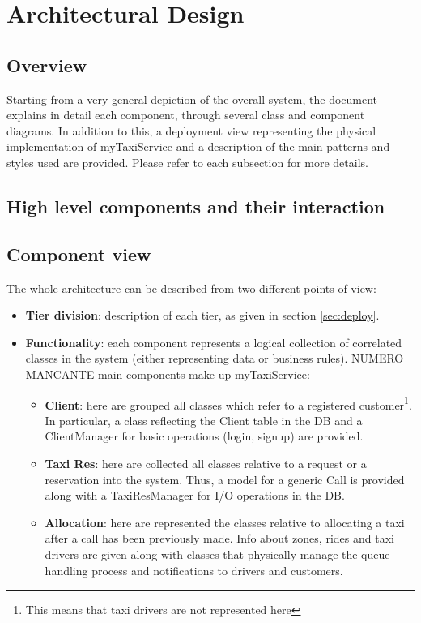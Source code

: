 \pagebreak
\section{Architectural Design}
 
\subsection{Overview}
Starting from a very general depiction of the overall system, the document explains in detail each component, through several class and component diagrams. In addition to this, a deployment view representing the physical implementation of myTaxiService and a description of the main patterns and styles used are provided. Please refer to each subsection for more details.

\subsection{High level components and their interaction}

\subsection{Component view}
The whole architecture can be described from two different points of view: 
\begin{itemize}
	\item \textbf{Tier division}: description of each tier, as given in section \ref{sec:deploy}.
	\item \textbf{Functionality}: each component represents a logical collection of correlated classes in the system (either representing data or business rules). NUMERO MANCANTE main components make up myTaxiService:
	\begin{itemize}
		\item \textbf{Client}: here are grouped all classes which refer to a registered customer\footnote{This means that taxi drivers are not represented here}. In particular, a class reflecting the Client table in the DB and a ClientManager for basic operations (login, signup) are provided.
		\newpage
		\item \textbf{Taxi Res}: here are collected all classes relative to a request or a reservation into the system. Thus, a model for a generic Call is provided along with a TaxiResManager for I/O operations in the DB.
		\newpage
		\item \textbf{Allocation}: here are represented the classes relative to allocating a taxi after a call has been previously made. Info about zones, rides and taxi drivers are given along with classes that physically manage the queue-handling process and notifications to drivers and customers.
		\newpage
	\end{itemize}
\end{itemize}

